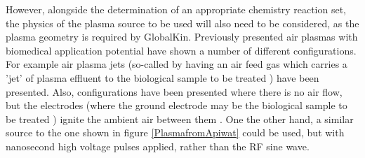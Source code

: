 \documentclass[11pt, oneside]{article}   	%
\begin{document}
However, alongside the determination of an appropriate chemistry reaction set, the physics of the plasma source to be used will also need to be considered, as the plasma geometry is required by GlobalKin.
Previously presented air plasmas with biomedical application potential have shown a number of different configurations.
For example air plasma jets (so-called by having an air feed gas which carries a 'jet' of plasma effluent to the biological sample to be treated \cite{Kolb2008cold, Chen2009blood}) have been presented.
Also, configurations have been presented where there is no air flow, but the electrodes (where the ground electrode may be the biological sample to be treated \cite{Fridman2007floating}) ignite the ambient air between them \cite{Laroussi2004evaluation}. 
One the other hand, a similar source to the one shown in figure \ref{PlasmafromApiwat} could be used, but with nanosecond high voltage pulses applied, rather than the RF sine wave.


%
\end{document}
